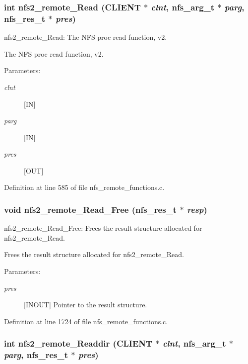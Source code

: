 \subsubsection{\setlength{\rightskip}{0pt plus 5cm}int nfs2\_\-remote\_\-Read (CLIENT $\ast$ {\em clnt}, nfs\_\-arg\_\-t $\ast$ {\em parg}, nfs\_\-res\_\-t $\ast$ {\em pres})}\label{group__NFSprocs_ga6}


nfs2\_\-remote\_\-Read: The NFS proc read function, v2.

The NFS proc read function, v2.

\begin{Desc}
\item[Parameters:]
\begin{description}
\item[{\em clnt}][IN] \item[{\em parg}][IN] \item[{\em pres}][OUT] \end{description}
\end{Desc}


Definition at line 585 of file nfs\_\-remote\_\-functions.c.
\subsubsection{\setlength{\rightskip}{0pt plus 5cm}void nfs2\_\-remote\_\-Read\_\-Free (nfs\_\-res\_\-t $\ast$ {\em resp})}\label{group__NFSprocs_ga58}


nfs2\_\-remote\_\-Read\_\-Free: Frees the result structure allocated for nfs2\_\-remote\_\-Read.

Frees the result structure allocated for nfs2\_\-remote\_\-Read.

\begin{Desc}
\item[Parameters:]
\begin{description}
\item[{\em pres}][INOUT] Pointer to the result structure. \end{description}
\end{Desc}


Definition at line 1724 of file nfs\_\-remote\_\-functions.c.
\subsubsection{\setlength{\rightskip}{0pt plus 5cm}int nfs2\_\-remote\_\-Readdir (CLIENT $\ast$ {\em clnt}, nfs\_\-arg\_\-t $\ast$ {\em parg}, nfs\_\-res\_\-t $\ast$ {\em pres})}\label{group__NFSprocs_ga16}


